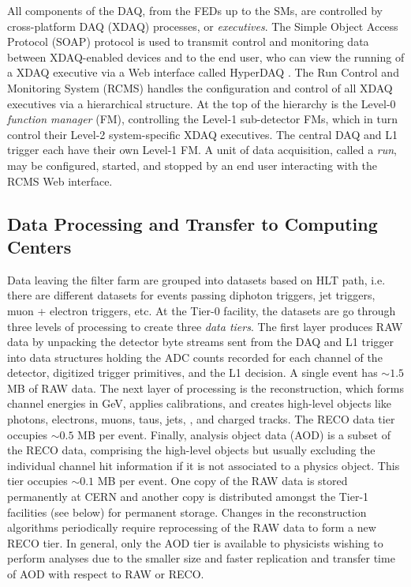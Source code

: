 \documentclass[dissertation.tex]{subfiles}
\begin{document}
All components of the DAQ, from the FEDs up to the SMs, are controlled by cross-platform DAQ (XDAQ) \cite{springerlink:10.1023/A:1012744721976} processes, or \textit{executives}.  The Simple Object Access Protocol (SOAP) \cite{SOAP} protocol is used to transmit control and monitoring data between XDAQ-enabled devices and to the end user, who can view the running of a XDAQ executive via a Web interface called HyperDAQ \cite{HyperDAQ}.  The Run Control and Monitoring System (RCMS) handles the configuration and control of all XDAQ executives via a hierarchical structure.  At the top of the hierarchy is the Level-0 \textit{function manager} (FM), controlling the Level-1 sub-detector FMs, which in turn control their Level-2 system-specific XDAQ executives.  The central DAQ and L1 trigger each have their own Level-1 FM.  A unit of data acquisition, called a \textit{run}, may be configured, started, and stopped by an end user interacting with the RCMS Web interface.

\subsection{Data Processing and Transfer to Computing Centers}
\label{sec:Data Processing and Transfer to Computing Centers}

Data leaving the filter farm are grouped into datasets based on HLT path, i.e. there are different datasets for events passing diphoton triggers, jet triggers, muon + electron triggers, etc.  At the Tier-0 facility, the datasets are go through three levels of processing to create three \textit{data tiers}.  The first layer produces RAW data by unpacking the detector byte streams sent from the DAQ and L1 trigger into data structures holding the ADC counts recorded for each channel of the detector, digitized trigger primitives, and the L1 decision.  A single event has $\sim1.5$ MB of RAW data.  The next layer of processing is the reconstruction, which forms channel energies in GeV, applies calibrations, and creates high-level objects like photons, electrons, muons, taus, jets, \MET, and charged tracks.  The RECO data tier occupies $\sim0.5$ MB per event.  Finally, analysis object data (AOD) is a subset of the RECO data, comprising the high-level objects but usually excluding the individual channel hit information if it is not associated to a physics object.  This tier occupies $\sim0.1$ MB per event.  One copy of the RAW data is stored permanently at CERN and another copy is distributed amongst the Tier-1 facilities (see below) for permanent storage.  Changes in the reconstruction algorithms periodically require reprocessing of the RAW data to form a new RECO tier.  In general, only the AOD tier is available to physicists wishing to perform analyses due to the smaller size and faster replication and transfer time of AOD with respect to RAW or RECO.
\end{document}

